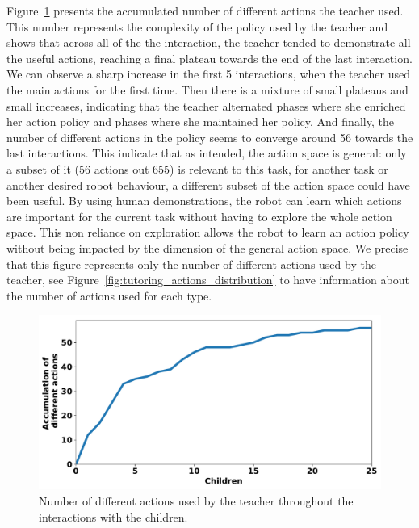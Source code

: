 Figure~\ref{fig:tutoring_actions} presents the accumulated number of different actions the teacher used. This number represents the complexity of the policy used by the teacher and shows that across all of the the interaction, the teacher tended to demonstrate all the useful actions, reaching a final plateau towards the end of the last interaction. We can observe a sharp increase in the first 5 interactions, when the teacher used the main actions for the first time. Then there is a mixture of small plateaus and small increases, indicating that the teacher alternated phases where she enriched her action policy and phases where she maintained her policy. And finally, the number of different actions in the policy seems to converge around 56 towards the last interactions. This indicate that as intended, the action space is general: only a subset of it (56 actions out 655) is relevant to this task, for another task or another desired robot behaviour, a different subset of the action space could have been useful. By using human demonstrations, the robot can learn which actions are important for the current task without having to explore the whole action space. This non reliance on exploration allows the robot to learn an action policy without being impacted by the dimension of the general action space. We precise that this figure represents only the number of different actions used by the teacher, see Figure~\ref{fig:tutoring_actions_distribution} to have information about the number of actions used for each type.

\begin{figure}[ht]
	\includegraphics[width=.85\linewidth]{./number_actions.pdf}
	\centering
	\caption{Number of different actions used by the teacher throughout the interactions with the children.}
	\label{fig:tutoring_actions}
\end{figure}


